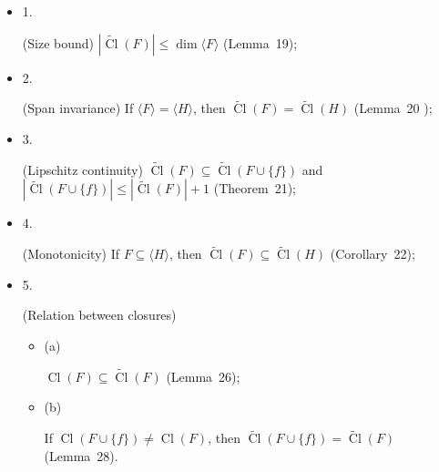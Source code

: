 \documentclass[10pt,a4paper]{article}
\begin{document}
\begin{itemize}


\item 
1. 


(Size bound) $|\widetilde{\mathop{\mathrm{Cl}}}(F)|\leq\dim\langle F\rangle$ (Lemma 19);\par





\item 
2. 


(Span invariance) If $\langle F\rangle=\langle H\rangle$, then $\widetilde{\mathop{\mathrm{Cl}}}(F)=\widetilde{\mathop{\mathrm{Cl}}}(H)$ (Lemma 20 );\par





\item 
3. 


(Lipschitz continuity) $\widetilde{\mathop{\mathrm{Cl}}}(F)\subseteq\widetilde{\mathop{\mathrm{Cl}}}(F\cup\{f\})$ and $|\widetilde{\mathop{\mathrm{Cl}}}(F\cup\{f\})|\leq|\widetilde{\mathop{\mathrm{Cl}}}(F)|+1$ (Theorem 21);\par





\item 
4. 


(Monotonicity) If $F\subseteq\langle H\rangle$, then $\widetilde{\mathop{\mathrm{Cl}}}(F)\subseteq\widetilde{\mathop{\mathrm{Cl}}}(H)$ (Corollary 22);\par





\item 
5. 


(Relation between closures)\par


\begin{itemize}


\item 
(a) 


$\mathop{\mathrm{Cl}}(F)\subseteq\widetilde{\mathop{\mathrm{Cl}}}(F)$ (Lemma 26);\par





\item 
(b) 


If $\mathop{\mathrm{Cl}}(F\cup\{f\})\neq\mathop{\mathrm{Cl}}(F)$, then
$\widetilde{\mathop{\mathrm{Cl}}}(F\cup\{f\})=\widetilde{\mathop{\mathrm{Cl}}}(F)$ (Lemma 28).\par





\end{itemize}





\end{itemize}
\end{document}
